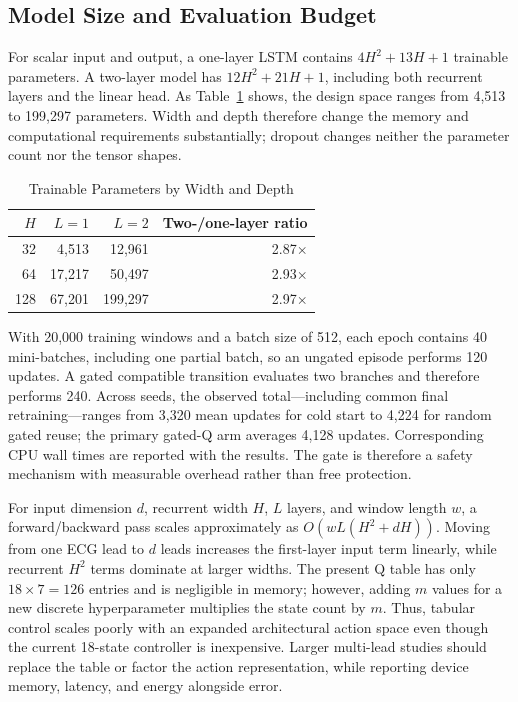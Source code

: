 \documentclass[conference]{IEEEtran}
\begin{document}
\subsection{Model Size and Evaluation Budget}
For scalar input and output, a one-layer LSTM contains
$4H^2+13H+1$ trainable parameters. A two-layer model has
$12H^2+21H+1$, including both recurrent layers and the linear head. As Table~\ref{tab:params} shows, the design space ranges from 4,513 to 199,297 parameters. Width and depth therefore change the memory and computational requirements substantially; dropout changes neither the parameter count nor the tensor shapes.

\begin{table}[t]
\caption{Trainable Parameters by Width and Depth}
\label{tab:params}
\centering
\footnotesize
\begin{tabular}{@{}rrrr@{}}
\toprule
$H$ & $L=1$ & $L=2$ & Two-/one-layer ratio \\
\midrule
32  & 4,513  & 12,961  & 2.87$\times$ \\
64  & 17,217 & 50,497  & 2.93$\times$ \\
128 & 67,201 & 199,297 & 2.97$\times$ \\
\bottomrule
\end{tabular}
\end{table}

With 20,000 training windows and a batch size of 512, each epoch contains 40 mini-batches, including one partial batch, so an ungated episode performs 120 updates. A gated compatible transition evaluates two branches and therefore performs 240. Across seeds, the observed total---including common final retraining---ranges from 3,320 mean updates for cold start to 4,224 for random gated reuse; the primary gated-Q arm averages 4,128 updates. Corresponding CPU wall times are reported with the results. The gate is therefore a safety mechanism with measurable overhead rather than free protection.

For input dimension $d$, recurrent width $H$, $L$ layers, and window length $w$, a forward/backward pass scales approximately as $O(wL(H^2+dH))$. Moving from one ECG lead to $d$ leads increases the first-layer input term linearly, while recurrent $H^2$ terms dominate at larger widths. The present Q table has only $18\times7=126$ entries and is negligible in memory; however, adding $m$ values for a new discrete hyperparameter multiplies the state count by $m$. Thus, tabular control scales poorly with an expanded architectural action space even though the current 18-state controller is inexpensive. Larger multi-lead studies should replace the table or factor the action representation, while reporting device memory, latency, and energy alongside error.
\end{document}

